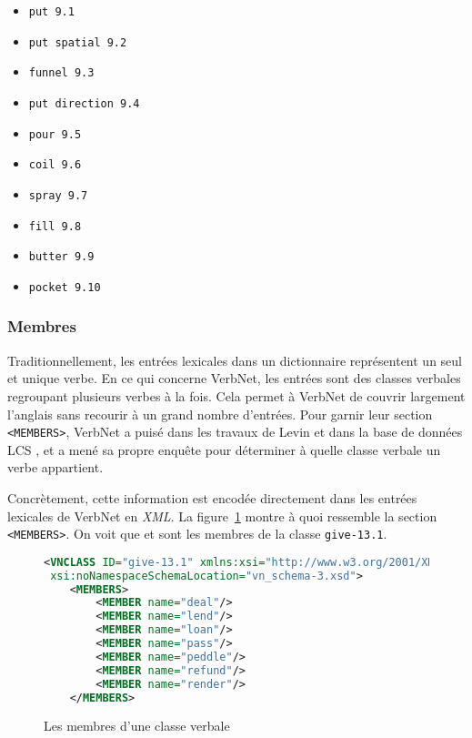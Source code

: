 \begin{itemize}
  \item \texttt{put 9.1}
	\item \texttt{put spatial 9.2}
	\item \texttt{funnel 9.3}
	\item \texttt{put direction 9.4}
	\item \texttt{pour 9.5}
	\item \texttt{coil 9.6}
	\item \texttt{spray 9.7}
	\item \texttt{fill 9.8}
	\item \texttt{butter 9.9}
	\item \texttt{pocket 9.10}
\end{itemize}

\subsubsection{Membres}
Traditionnellement, les entrées lexicales dans un dictionnaire représentent un seul et unique verbe. En ce qui concerne VerbNet, les entrées sont des classes verbales regroupant  plusieurs verbes à la fois. Cela permet à VerbNet de couvrir largement l'anglais sans recourir à un grand nombre d'entrées. Pour garnir leur section \texttt{<MEMBERS>}, VerbNet a puisé dans les travaux de Levin \cite{verb-classes.levin.1993} et dans la base de données LCS \citep{AyanGeneratingParsingLexicon2002a}, et a mené sa propre enquête pour déterminer à quelle classe verbale un verbe appartient.

Concrètement, cette information est encodée directement dans les entrées lexicales de VerbNet en \emph{XML}. La figure~\ref{membre} montre à quoi ressemble la section \texttt{<MEMBERS>}. On voit que  et  sont les membres de la classe \texttt{give-13.1}.

\begin{figure}[htb]
  \caption{Les membres d'une classe verbale}
	\label{membre}
\begin{lstlisting}[language=XML]
<VNCLASS ID="give-13.1" xmlns:xsi="http://www.w3.org/2001/XMLSchema-instance"
 xsi:noNamespaceSchemaLocation="vn_schema-3.xsd">
    <MEMBERS>
        <MEMBER name="deal"/>
        <MEMBER name="lend"/>
        <MEMBER name="loan"/>
        <MEMBER name="pass"/>
        <MEMBER name="peddle"/>
        <MEMBER name="refund"/>
        <MEMBER name="render"/>
    </MEMBERS>
\end{lstlisting}
\end{figure}

